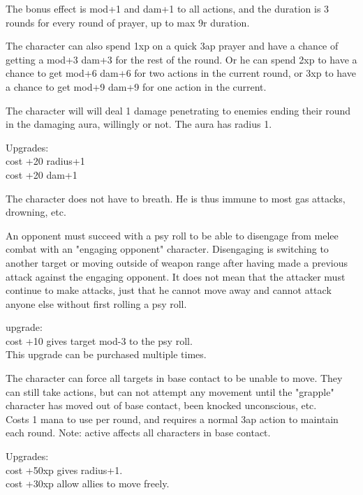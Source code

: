 The bonus effect is mod+1 and dam+1 to all actions, and the duration is 3 rounds for every round of prayer, up to max 9r duration.

The character can also spend 1xp on a quick 3ap prayer and have a chance of getting a mod+3 dam+3 for the rest of the round. Or he can spend 2xp to have a chance to get mod+6 dam+6 for two actions in the current round, or 3xp to have a chance to get mod+9 dam+9 for one action in the current. %


 The character will will deal 1 damage penetrating to enemies ending their round in the damaging aura, willingly or not. The aura has radius 1.

Upgrades:\\
cost +20 radius+1 \\
cost +20 dam+1


 The character does not have to breath. He is thus immune to most gas attacks, drowning, etc.


 An opponent must succeed with a psy roll to be able to disengage from melee combat with an "engaging opponent" character. Disengaging is switching to another target or moving outside of weapon range after having made a previous attack against the engaging opponent. It does not mean that the attacker must continue to make attacks, just that he cannot move away and cannot attack anyone else without first rolling a psy roll.

upgrade: \\
cost +10 gives target mod-3 to the psy roll. \\
This upgrade can be purchased multiple times.


 The character can force all targets in base contact to be unable to move. They can still take actions, but can not attempt any movement until the "grapple" character has moved out of base contact, been knocked unconscious, etc. \\
Costs 1 mana to use per round, and requires a normal 3ap action to maintain each round. Note: active affects all characters in base contact.

Upgrades: \\
cost +50xp gives radius+1.\\
cost +30xp allow allies to move freely.


